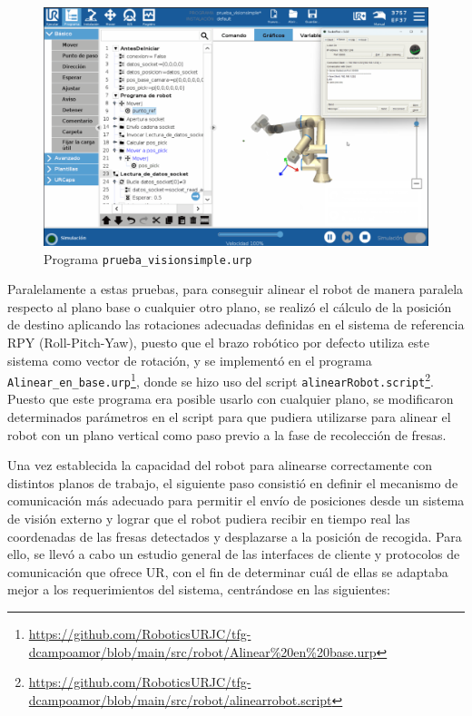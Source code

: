   \begin{figure}[H]
     \centering
     \begin{center}
       \includegraphics[width=155mm]{figs/prueba_visionsimple.png}
     \end{center}
     \caption{Programa \texttt{prueba\_visionsimple.urp}}
     \label{fig:prueba_visionsimple}
  \end{figure}
  
Paralelamente a estas pruebas, para conseguir alinear el robot de manera paralela respecto al plano base o cualquier otro plano, se realizó el cálculo de la posición de destino aplicando las rotaciones adecuadas definidas en el sistema de referencia RPY (Roll-Pitch-Yaw), puesto que el brazo robótico por defecto utiliza este sistema como vector de rotación, y se implementó en el programa \verb|Alinear_en_base.urp|\footnote{\url{https://github.com/RoboticsURJC/tfg-dcampoamor/blob/main/src/robot/Alinear\%20en\%20base.urp}}, donde se hizo uso del script \verb|alinearRobot.script|\footnote{\url{https://github.com/RoboticsURJC/tfg-dcampoamor/blob/main/src/robot/alinearrobot.script}}. Puesto que este programa era posible usarlo con cualquier plano, se modificaron determinados parámetros en el script para que pudiera utilizarse para alinear el robot con un plano vertical como paso previo a la fase de recolección de fresas.

Una vez establecida la capacidad del robot para alinearse correctamente con distintos planos de trabajo, el siguiente paso consistió en definir el mecanismo de comunicación más adecuado para permitir el envío de posiciones desde un sistema de visión externo y lograr que el robot pudiera recibir en tiempo real las coordenadas de las fresas detectados y desplazarse a la posición de recogida. Para ello, se llevó a cabo un estudio general de las interfaces de cliente y protocolos de comunicación que ofrece UR, con el fin de determinar cuál de ellas se adaptaba mejor a los requerimientos del sistema, centrándose en las siguientes:

